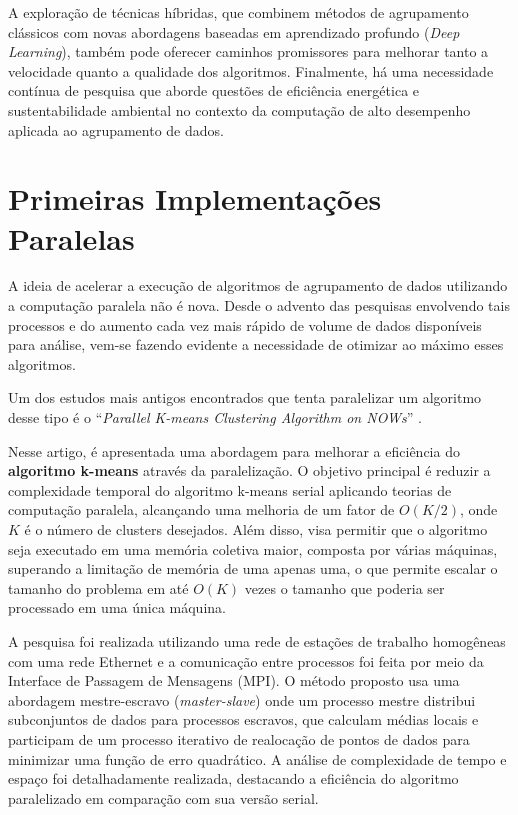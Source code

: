 \documentclass[12pt,
openright, 
oneside, %
a4paper,    %
brazil]{facom-ufu-abntex2}
\begin{document}
A exploração de técnicas híbridas, que combinem métodos de agrupamento clássicos com novas abordagens baseadas em aprendizado profundo (\textit{Deep Learning}), também pode oferecer caminhos promissores para melhorar tanto a velocidade quanto a qualidade dos algoritmos. Finalmente, há uma necessidade contínua de pesquisa que aborde questões de eficiência energética e sustentabilidade ambiental no contexto da computação de alto desempenho aplicada ao agrupamento de dados.




\section{Primeiras Implementações Paralelas}

A ideia de acelerar a execução de algoritmos de agrupamento de dados utilizando a computação paralela não é nova. Desde o advento das pesquisas envolvendo tais processos e do aumento cada vez mais rápido de volume de dados disponíveis para análise, vem-se fazendo evidente a necessidade de otimizar ao máximo esses algoritmos.

Um dos estudos mais antigos encontrados que tenta paralelizar um algoritmo desse tipo é o \enquote{\textit{Parallel K-means Clustering Algorithm on NOWs}} \cite{kMeansParallelkantabutra2000}.

Nesse artigo, é apresentada uma abordagem para melhorar a eficiência do \textbf{algoritmo k-means} através da paralelização. O objetivo principal é reduzir a complexidade temporal do algoritmo k-means serial aplicando teorias de computação paralela, alcançando uma melhoria de um fator de $O(K/2)$, onde $K$ é o número de clusters desejados. Além disso, visa permitir que o algoritmo seja executado em uma memória coletiva maior, composta por várias máquinas, superando a limitação de memória de uma apenas uma, o que permite escalar o tamanho do problema em até $O(K)$ vezes o tamanho que poderia ser processado em uma única máquina.

A pesquisa foi realizada utilizando uma rede de estações de trabalho homogêneas com uma rede Ethernet e a comunicação entre processos foi feita por meio da Interface de Passagem de Mensagens (MPI). O método proposto usa uma abordagem mestre-escravo (\textit{master-slave}) onde um processo mestre distribui subconjuntos de dados para processos escravos, que calculam médias locais e participam de um processo iterativo de realocação de pontos de dados para minimizar uma função de erro quadrático. A análise de complexidade de tempo e espaço foi detalhadamente realizada, destacando a eficiência do algoritmo paralelizado em comparação com sua versão serial.
\end{document}
